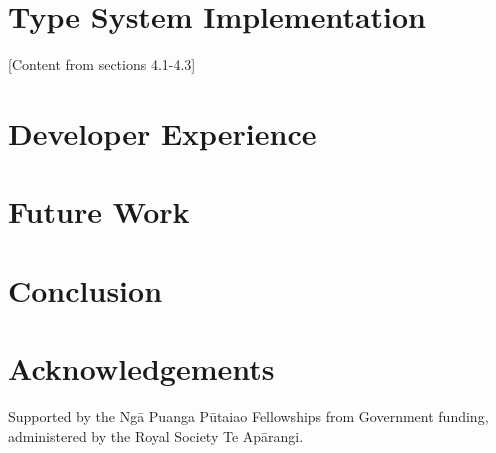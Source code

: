 \documentclass{article}
\begin{document}
\section{Type System Implementation}
\label{sec:implementation}

[Content from sections 4.1-4.3]

\section{Developer Experience}
\label{sec:dev-experience}


\section{Future Work}
\label{sec:future}


\section{Conclusion}
\label{sec:conclusion}


\section*{Acknowledgements}

Supported by the Ngā Puanga Pūtaiao Fellowships from Government funding, administered by the Royal Society Te Apārangi.

\printglossaries
\printbibliography
\end{document}
